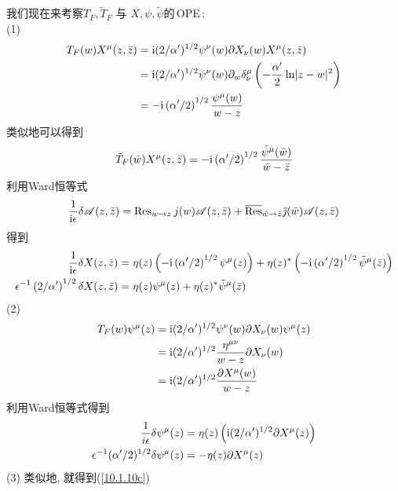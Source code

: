 \begin{tcolorbox}
\noindent 我们现在来考察$ T_{F},\tilde{T}_{F} $%
与 $X,\psi ,\tilde{\psi} $的\,OPE\,: \\
(1)
\begin{align*}
T_{F}(w)X^{\mu }(z,\bar{z}) &=\mathrm{i}(2/\alpha ^{\prime })^{1/2}\psi ^{\nu
}(w)\partial X_{\nu }(w)X^{\mu }(z,\bar{z}) \\
&=\mathrm{i}(2/\alpha ^{\prime })^{1/2}\psi ^{\nu }(w)\partial _{w}\delta _{\nu
}^{\mu }\left( -\frac{\alpha ^{\prime }}{2}\ln \lvert z-w\rvert
^{2}\right)  \\
&=-\mathrm{i}\left( \alpha ^{\prime }/2\right) ^{1/2}\frac{\psi ^{\mu }(w)}{w-z}
\end{align*}%
类似地可以得到\[
\tilde{T}_{F}(\bar{w})X^{\mu }(z,\bar{z})=-\mathrm{i}\left( \alpha ^{\prime
}/2\right) ^{1/2}\frac{\tilde{\psi}^{\mu }(\bar{w})}{\bar{w}-\bar{z}}
\]%
利用Ward恒等式\[
\frac{1}{\mi\epsilon }\delta \mathscr{A}(z,\bar{z})=\operatorname{Res}_{w\rightarrow z}j(w)\mathscr{A}(z,%
\bar{z})+\overline{\operatorname{Res}}_{\bar{w}\rightarrow \bar{z}}\tilde{\jmath}(\bar{w})\mathscr{A}(z,\bar{z}%
)
\]%
得到\begin{align*}
\frac{1}{\mi\epsilon }\delta X(z,\bar{z}) &=\eta (z)\left( -\mi\left( \alpha
^{\prime }/2\right) ^{1/2}\psi ^{\mu }(z)\right) +\eta (z)^{\ast }\left(
-\mi\left( \alpha ^{\prime }/2\right) ^{1/2}\tilde{\psi}^{\mu }(\bar{z}%
)\right)  \\
\epsilon ^{-1}\left( 2/\alpha ^{\prime }\right) ^{1/2}\delta X(z,\bar{z})
&=\eta (z)\psi ^{\mu }(z)+\eta (z)^{\ast }\tilde{\psi}^{\mu }(\bar{z})
\end{align*}%
(2)%
\begin{align*}
T_{F}(w)\psi ^{\mu }(z) &=\mathrm{i}(2/\alpha ^{\prime })^{1/2}\psi ^{\nu
}(w)\partial X_{\nu }(w)\psi ^{\mu }(z) \\
&=\mathrm{i}(2/\alpha ^{\prime })^{1/2}\frac{\eta ^{\mu \nu }}{w-z}\partial X_{\nu
}(w) \\
&=\mathrm{i}(2/\alpha ^{\prime })^{1/2}\frac{\partial X^{\mu }(w)}{w-z}
\end{align*}%
利用Ward恒等式得到\begin{align*}
\frac{1}{i\epsilon }\delta \psi ^{\mu }(z) &=\eta (z)\left( \mathrm{i}(2/\alpha
^{\prime })^{1/2}\partial X^{\mu }(z)\right)  \\
\epsilon ^{-1}(\alpha ^{\prime }/2)^{1/2}\delta \psi ^{\mu }(z) &=-\eta
(z)\partial X^{\mu }(z)
\end{align*}%
(3) 类似地, 就得到(\ref{10.1.10c})
\end{tcolorbox}


